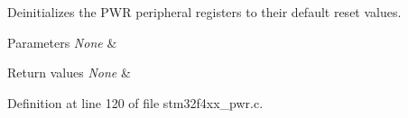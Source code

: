 Deinitializes the P\-W\-R peripheral registers to their default reset values. 


\begin{DoxyParams}{Parameters}
{\em None} & \\
\hline
\end{DoxyParams}

\begin{DoxyRetVals}{Return values}
{\em None} & \\
\hline
\end{DoxyRetVals}


Definition at line 120 of file stm32f4xx\-\_\-pwr.\-c.

